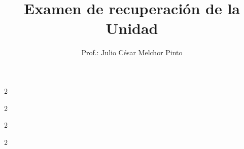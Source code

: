\documentclass[12pt,addpoints]{evalua}
\title{Examen de {\color{brown}recuperación} de la Unidad}
\author{Prof.: Julio César Melchor Pinto}
\begin{document}
\begin{questions}
   \question[5]{}
   
   \newpage

   \question[5]{\footnotesize}

    \begin{multicols}{2}

        \question[5]{}

        \question[5]{}
    \end{multicols}
    
    \begin{multicols}{2}
\question[5]{}

\question[5]{}
    \end{multicols}
    
    \begin{multicols}{2}
        \question[5]{}
        \question[5]{}
    \end{multicols}
\question[6]{}

\question[10]{}

\question[10]{}

\newpage

    \begin{multicols}{2}
\question[15]{}
\question[15]{}
    \end{multicols}
\question[4]{}
\end{questions}
\begin{landscape}
    \begin{minipage}[b]{\textwidth}
        \thispagestyle{foot}
        \begin{table}[H]
            \centering
            \caption{Tabla Peri\'odica de los Elementos.}
            \TablaPeriodica[0.48]
            \label{tab:periodic_table}
        \end{table}
    \end{minipage}
\end{landscape}
\end{document}
